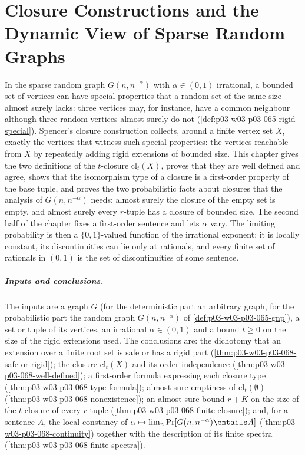 \chapter{Closure Constructions and the Dynamic View of Sparse Random Graphs}
\label{sec:p03-w03-p03-068-closure}

In the sparse random graph \(G(n,n^{-\alpha})\) with \(\alpha\in(0,1)\)
irrational, a bounded set of vertices can have special properties that a
random set of the same size almost surely lacks: three vertices may, for
instance, have a common neighbour although three random vertices almost surely
do not (\cref{def:p03-w03-p03-065-rigid-special}).  Spencer's closure
construction collects, around a finite vertex set \(X\), exactly the vertices
that witness such special properties: the vertices reachable from \(X\) by
repeatedly adding rigid extensions of bounded size.  This chapter gives the
two definitions of the \(t\)-closure \(\mathrm{cl}_t(X)\), proves that they
are well defined and agree, shows that the isomorphism type of a closure is a
first-order property of the base tuple, and proves the two probabilistic
facts about closures that the analysis of \(G(n,n^{-\alpha})\) needs: almost
surely the closure of the empty set is empty, and almost surely every
\(r\)-tuple has a closure of bounded size.  The second half of the chapter
fixes a first-order sentence and lets \(\alpha\) vary.  The limiting
probability is then a \(\{0,1\}\)-valued function of the irrational
exponent; it is locally constant, its discontinuities can lie only at
rationals, and every finite set of rationals in \((0,1)\) is the set of
discontinuities of some sentence.

\paragraph{Inputs and conclusions.}
The inputs are a graph \(G\) (for the deterministic part an arbitrary
graph, for the probabilistic part the random graph \(G(n,n^{-\alpha})\) of
\cref{def:p03-w03-p03-065-gnp}), a set or tuple of its vertices, an
irrational \(\alpha\in(0,1)\) and a bound \(t\geq0\) on the size of the rigid
extensions used.  The conclusions are: the dichotomy that an extension over
a finite root set is safe or has a rigid part
(\cref{thm:p03-w03-p03-068-safe-or-rigid}); the closure \(\mathrm{cl}_t(X)\) and
its order-independence (\cref{thm:p03-w03-p03-068-well-defined}); a
first-order formula expressing each closure type
(\cref{thm:p03-w03-p03-068-type-formula}); almost sure emptiness of
\(\mathrm{cl}_t(\emptyset)\) (\cref{thm:p03-w03-p03-068-nonexistence}); an
almost sure bound \(r+K\) on the size of the \(t\)-closure of every
\(r\)-tuple (\cref{thm:p03-w03-p03-068-finite-closure}); and, for a sentence
\(A\), the local constancy of \(\alpha\mapsto\lim_n\Pr[G(n,n^{-\alpha})\entails
A]\) (\cref{thm:p03-w03-p03-068-continuity}) together with the description
of its finite spectra (\cref{thm:p03-w03-p03-068-finite-spectra}).

